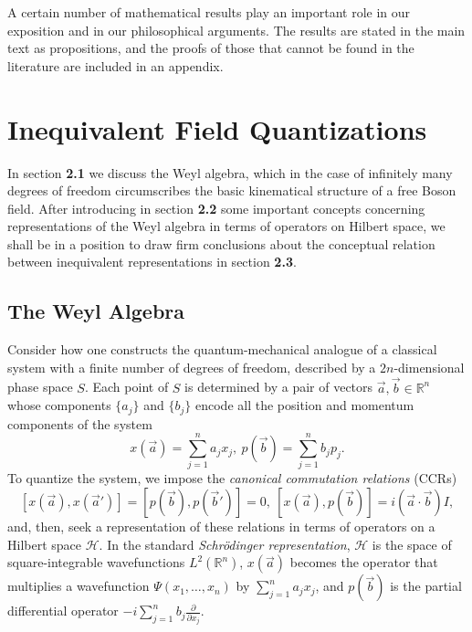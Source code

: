 \documentclass[12pt]{article}
\theoremstyle{remark}
\theoremstyle{definition}
\newcommand{\hil}[1]{\mathcal{#1}}
\begin{document}
A certain number of mathematical results play an important role in our
exposition and in our philosophical arguments.  The results are stated
in the main text as propositions, and the proofs of those that cannot
be found in the literature are included in an appendix.

\section{Inequivalent Field Quantizations}
In section \textbf{2.1} we discuss the Weyl algebra, which in the case
of infinitely many degrees of freedom circumscribes the basic
kinematical structure of a free Boson field.  After introducing in
section \textbf{2.2} some important concepts concerning
representations of the Weyl algebra in terms of operators on Hilbert
space, we shall be in a position to draw firm conclusions about the
conceptual relation between inequivalent representations in section
\textbf{2.3}.
 
\subsection{The Weyl Algebra}
Consider how one constructs the quantum-mechanical analogue of a classical 
system with a finite number of degrees of freedom, described by a $2n$-dimensional 
phase space $S$.  
Each point of $S$ is determined by a pair of vectors 
$\vec{a},\vec{b}\in\mathbb{R}^{n}$ whose components $\{a_{j}\}$ and $\{b_{j}\}$  encode all the position and 
momentum components of the system
\begin{equation}
x(\vec{a})=\sum_{j=1}^{n}a_{j}x_{j},\ p(\vec{b})=\sum_{j=1}^{n}b_{j}p_{j}.
\end{equation}  
To quantize the system, we impose the \emph{canonical 
commutation relations} (CCRs)
\begin{equation} \label{eq:glob}
[x(\vec{a}),x(\vec{a}')]=[p(\vec{b}),p(\vec{b}')]=0,\ 
[x(\vec{a}),p(\vec{b})]=i(\vec{a}\cdot\vec{b})I,
\end{equation}
and, then, seek a representation of these relations in terms of 
operators on a Hilbert space $\hil{H}$.  In the standard \emph{Schr\"{o}dinger 
representation}, $\hil{H}$ is the space of square-integrable wavefunctions 
$L^{2}(\mathbb{R}^{n})$, $x(\vec{a})$ becomes the operator that 
multiplies a wavefunction $\Psi(x_{1},\ldots,x_{n})$ 
by $\sum_{j=1}^{n}a_{j}x_{j}$, and $p(\vec{b})$ is the partial 
differential operator $-i\sum_{j=1}^{n}b_{j}\frac{\partial}{\partial 
x_{j}}$.  
\end{document}
